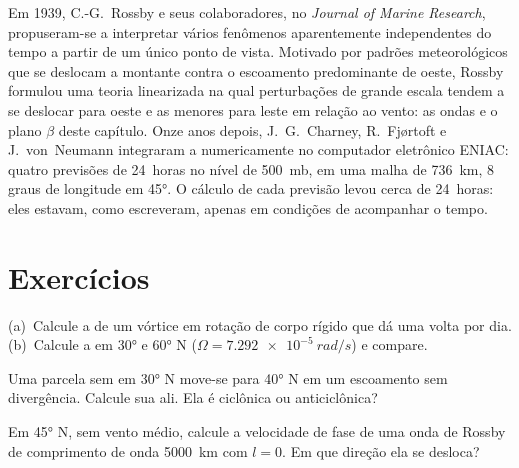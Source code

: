 \begin{history}
Em 1939, C.-G.~Rossby e seus colaboradores, no \emph{Journal of Marine
Research}, propuseram-se a interpretar vários fenômenos aparentemente independentes
do tempo a partir de um único ponto de vista. Motivado por padrões meteorológicos
que se deslocam a montante contra o escoamento predominante de oeste, Rossby formulou
uma teoria linearizada na qual perturbações de grande escala tendem a se deslocar para oeste
e as menores para leste em relação ao vento: as ondas e o
plano $\beta$ deste capítulo. Onze anos depois, J.~G.~Charney,
R.~Fjørtoft e J.~von~Neumann integraram a 
numericamente no computador eletrônico ENIAC: quatro previsões de 24~horas no
nível de \qty{500}{mb}, em uma malha de \qty{736}{km}, 8 graus de longitude
em \ang{45}. O cálculo de cada previsão levou cerca de 24~horas: eles
estavam, como escreveram, apenas em condições de acompanhar o tempo.
\end{history}

\section{Exercícios}

\begin{exercise}[$\star$]\label{exo:b3:atmospheric-dynamics:1}
(a)~Calcule a  de um vórtice em rotação de corpo rígido que dá
uma volta por dia. (b)~Calcule a  em \ang{30} e \ang{60} N
($\Omega = \qty{7.292e-5}{rad/s}$) e compare.
\end{exercise}

\begin{exercise}[$\star$]\label{exo:b3:atmospheric-dynamics:2}
Uma parcela sem  em \ang{30} N move-se para \ang{40} N em um
escoamento sem divergência. Calcule sua  ali. Ela é
ciclônica ou anticiclônica?
\end{exercise}

\begin{exercise}[$\star$]\label{exo:b3:atmospheric-dynamics:3}
Em \ang{45} N, sem vento médio, calcule a velocidade de fase de uma onda de Rossby
de comprimento de onda \qty{5000}{km} com $l = 0$. Em que direção ela se desloca?
\end{exercise}

